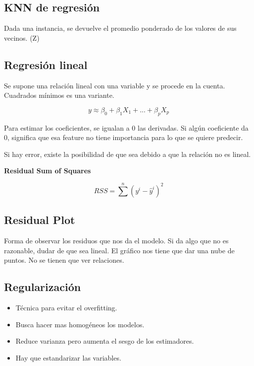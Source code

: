 \documentclass[titlepage,a4paper]{article}
\begin{document}

\subsection{KNN de regresión}
Dada una instancia, se devuelve el promedio ponderado de los valores de sus vecinos. (Z)


\subsection{Regresión lineal}
Se supone una relación lineal con una variable y se procede en la cuenta. Cuadrados mínimos es una variante.

\begin{equation}
    y \approx \beta_0 + \beta_1 X_1 + ... + \beta_p X_p
\end{equation}

Para estimar los coeficientes, se igualan a 0 las derivadas. Si algún coeficiente da 0, significa que esa feature no tiene importancia para lo que se quiere predecir.

Si hay error, existe la posibilidad de que sea debido a que la relación no es lineal.

\textbf{Residual Sum of Squares}

\begin{equation}
    RSS = \sum^{n} (y^{i}-\hat{y}^{i})^{2}
\end{equation}


\subsection{Residual Plot}

Forma de observar los residuos que nos da el modelo. Si da algo que no es razonable, dudar de que sea lineal. El gráfico nos tiene que dar una nube de puntos. No se tienen que ver relaciones.



\subsection{Regularización} \label{regularizaciones}
\begin{itemize}
    \item Técnica para evitar el overfitting.
    \item Busca hacer mas homogéneos los modelos.
    \item Reduce varianza pero aumenta el sesgo de los estimadores.
    \item Hay que estandarizar las variables.
\end{itemize}
\end{document}
